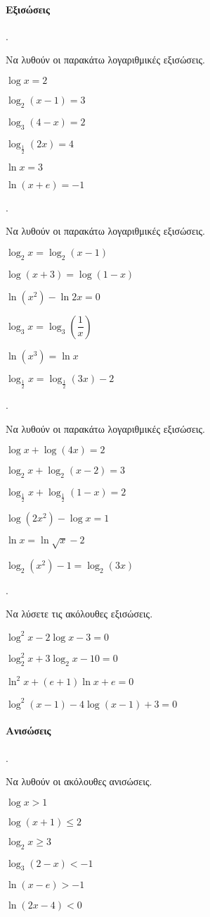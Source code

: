 \documentclass[11pt,a4paper,twocolumn]{article}
\newcounter{askhsh}
\newcommand{\askhsh}{{\large\theaskhsh.}\ \addtocounter{askhsh}{1}}
\begin{document}
\paragraph{Εξισώσεις}
\askhsh Να λυθούν οι παρακάτω λογαριθμικές εξισώσεις.
\begin{multicols}{2}
\begin{alist}
\item $\log{x}=2$
\item $\log_2{(x-1)}=3$
\item $\log_3{(4-x)}=2$
\item $\log_{\frac{1}{2}}{(2x)}=4$
\item $\ln{x}=3$
\item $\ln{(x+e)}=-1$
\end{alist}
\end{multicols}
\askhsh Να λυθούν οι παρακάτω λογαριθμικές εξισώσεις.
\begin{alist}
\item $\log_2{x}=\log_2{(x-1)}$
\item $\log{(x+3)}=\log{(1-x)}$
\item $\ln{(x^2)}-\ln{2x}=0$
\item $\log_3{x}=\log_3{\left(\dfrac{1}{x}\right)}$
\item $\ln{(x^3)}=\ln{x}$
\item $\log_{\frac{1}{2}}{x}=\log_{\frac{1}{2}}{(3x)}-2$
\end{alist}
\askhsh Να λυθούν οι παρακάτω λογαριθμικές εξισώσεις.
\begin{alist}
\item $\log{x}+\log{(4x)}=2$
\item $\log_2{x}+\log_2{(x-2)}=3$
\item $\log_{\frac{1}{2}}{x}+\log_{\frac{1}{2}}{(1-x)}=2$
\item $\log{(2x^2)}-\log{x}=1$
\item $\ln{x}=\ln{\sqrt{x}}-2$
\item $\log_2{(x^2)}-1=\log_2{(3x)}$
\end{alist}
\askhsh Να λύσετε τις ακόλουθες εξισώσεις.
\begin{alist}
\item $\log^2{x}-2\log{x}-3=0$
\item $\log_2^2{x}+3\log_2{x}-10=0$
\item $\ln^2{x}+(e+1)\ln{x}+e=0$
\item $\log^2{(x-1)}-4\log{(x-1)}+3=0$
\end{alist}
\paragraph{Ανισώσεις}
\askhsh Να λυθούν οι ακόλουθες ανισώσεις.
\begin{multicols}{2}
\begin{alist}
\item $\log{x}>1$
\item $\log{(x+1)}\leq 2$
\item $\log_2{x}\geq 3$
\item $\log_3{(2-x)}<-1$
\item $\ln{(x-e)}>-1$
\item $\ln{(2x-4)}<0$
\end{alist}
\end{multicols}
\end{document}

